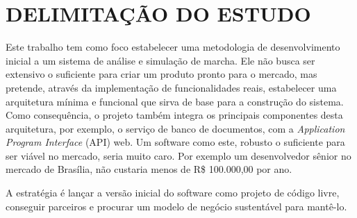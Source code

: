 \section[DELIMITAÇÃO DO ESTUDO]{DELIMITAÇÃO DO ESTUDO}

Este trabalho tem como foco estabelecer uma metodologia de desenvolvimento inicial a um sistema de análise e simulação de marcha. 
Ele não busca ser extensivo o suficiente para criar um produto pronto para o mercado, mas pretende, através da implementação de funcionalidades reais, estabelecer uma arquitetura mínima e funcional que sirva de base para a construção do sistema. 
Como consequência, o projeto também integra os principais componentes desta arquitetura, por exemplo, o serviço de banco de documentos, com a \emph{Application Program Interface} (API) web.
Um software como este, robusto o suficiente para ser viável no mercado, seria muito caro. Por exemplo um desenvolvedor sênior no mercado de Brasília, não custaria menos de R\$ 100.000,00 por ano. 

A estratégia é lançar a versão inicial do software como projeto de código livre, conseguir parceiros e procurar um modelo de negócio sustentável para mantê-lo.
